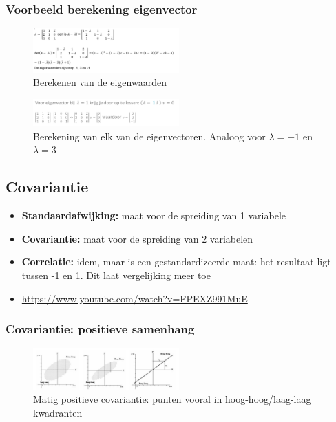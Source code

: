 \documentclass{article}
\begin{document}
\subsubsection{Voorbeeld berekening eigenvector}

\begin{figure}[H]
    \centering
    \includegraphics[width=0.5\textwidth]{eigenvector-berekening-voorbeeld.png}
    \caption{Berekenen van de eigenwaarden}
\end{figure}

\begin{figure}[H]
    \centering
    \includegraphics[width=0.5\textwidth]{eigenvector-berekening-voorbeeld2.png}
    \caption{Berekening van elk van de eigenvectoren. Analoog voor $\lambda = -1$ en $\lambda = 3$}
\end{figure}

\subsection{Covariantie}

\begin{itemize}
    \item \textbf{Standaardafwijking:} maat voor de spreiding van 1 variabele
    \item \textbf{Covariantie:} maat voor de spreiding van 2 variabelen
    \item \textbf{Correlatie:} idem, maar is een gestandardizeerde maat: het resultaat ligt tussen -1 en 1. Dit laat vergelijking meer toe
    \item \url{https://www.youtube.com/watch?v=FPEXZ991MuE}
\end{itemize}

\subsubsection{Covariantie: positieve samenhang}

\begin{figure}[H]
    \centering
    \includegraphics[width=0.5\textwidth]{covariantie-positieve-samenhang.png}
    \caption{Matig positieve covariantie: punten vooral in hoog-hoog/laag-laag kwadranten}
\end{figure}
\end{document}
